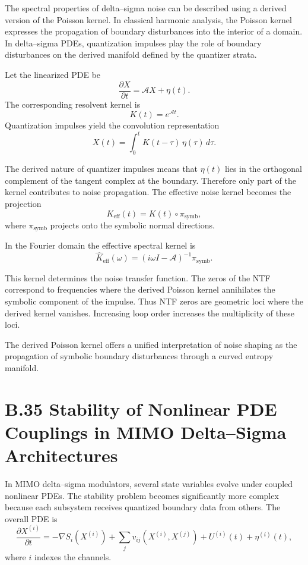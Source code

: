 The spectral properties of delta–sigma noise can be described using a derived version of the Poisson kernel. In classical harmonic analysis, the Poisson kernel expresses the propagation of boundary disturbances into the interior of a domain. In delta–sigma PDEs, quantization impulses play the role of boundary disturbances on the derived manifold defined by the quantizer strata.

Let the linearized PDE be
\[
\frac{\partial X}{\partial t} = \mathcal{A}X + \eta(t).
\]
The corresponding resolvent kernel is
\[
K(t) = e^{\mathcal{A}t}.
\]
Quantization impulses yield the convolution representation
\[
X(t) 
= \int_{0}^{t} K(t-\tau)\,\eta(\tau)\, d\tau.
\]

The derived nature of quantizer impulses means that \(\eta(t)\) lies in the orthogonal complement of the tangent complex at the boundary. Therefore only part of the kernel contributes to noise propagation. The effective noise kernel becomes the projection
\[
K_{\mathrm{eff}}(t) = K(t)\circ \pi_{\mathrm{symb}},
\]
where \(\pi_{\mathrm{symb}}\) projects onto the symbolic normal directions.

In the Fourier domain the effective spectral kernel is
\[
\widehat{K}_{\mathrm{eff}}(\omega)
= \left(i\omega I - \mathcal{A}\right)^{-1}\pi_{\mathrm{symb}}.
\]

This kernel determines the noise transfer function. The zeros of the NTF correspond to frequencies where the derived Poisson kernel annihilates the symbolic component of the impulse. Thus NTF zeros are geometric loci where the derived kernel vanishes. Increasing loop order increases the multiplicity of these loci.

The derived Poisson kernel offers a unified interpretation of noise shaping as the propagation of symbolic boundary disturbances through a curved entropy manifold.

\section{B.35 Stability of Nonlinear PDE Couplings in MIMO Delta–Sigma Architectures}

In MIMO delta–sigma modulators, several state variables evolve under coupled nonlinear PDEs. The stability problem becomes significantly more complex because each subsystem receives quantized boundary data from others. The overall PDE is
\[
\frac{\partial X^{(i)}}{\partial t}
= -\nabla S_{i}(X^{(i)})
+ \sum_{j} v_{ij}(X^{(i)}, X^{(j)})
+ U^{(i)}(t)
+ \eta^{(i)}(t),
\]
where \(i\) indexes the channels.

